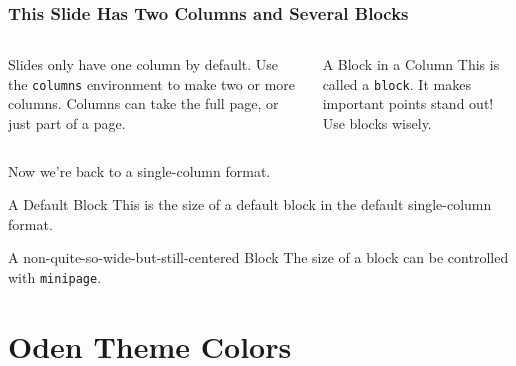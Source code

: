 \documentclass[10pt, aspectratio=169]{oden_beamer}
\begin{document}
\begin{frame} %
\frametitle{This Slide Has Two Columns and Several Blocks}
\begin{columns}
\begin{column}{.49\textwidth}
    Slides only have one column by default.
    Use the \texttt{columns} environment to make two or more columns.
    Columns can take the full page, or just part of a page.
\end{column}
%
\begin{column}{.49\textwidth}
    \begin{block}{A Block in a Column}
        This is called a \texttt{block}.
        It makes important points stand out!
        Use blocks wisely.
    \end{block}
\end{column}
\end{columns}

\vspace{.5cm}
Now we're back to a single-column format.

\pause %

\begin{block}{A Default Block}
     This is the size of a default block in the default single-column format.
\end{block}

\begin{center}
\begin{minipage}{.9\textwidth}
\begin{block}{A non-quite-so-wide-but-still-centered Block}
    The size of a block can be controlled with \texttt{minipage}.
\end{block}
\end{minipage}
\end{center}
\end{frame}


\section{Oden Theme Colors} %
\end{document}

